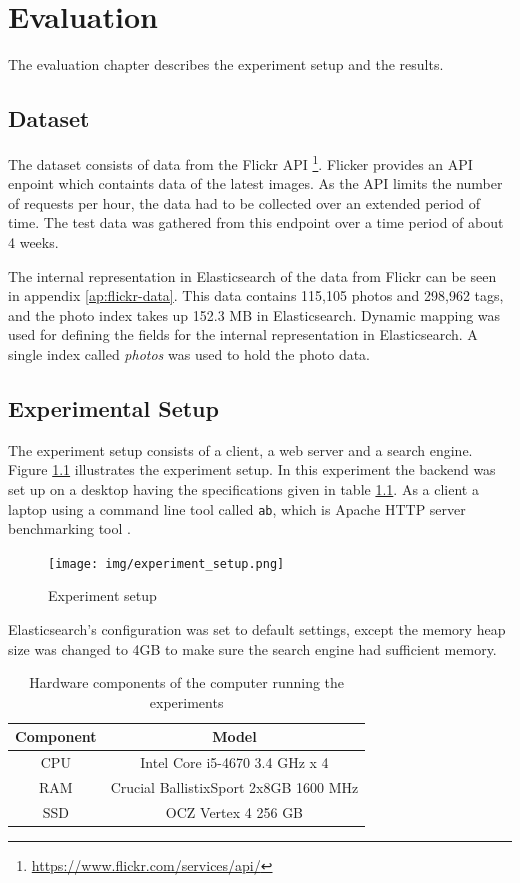 \chapter{Evaluation}
\label{ch:evaluation}
The evaluation chapter describes the experiment setup and the results.

\section{Dataset}
The dataset consists of data from the Flickr API \footnote{\url{https://www.flickr.com/services/api/}}.
Flicker provides an API enpoint which containts data of the latest images.
As the API limits the number of requests per hour, the data had to be collected over an extended period of time.
The test data was gathered from this endpoint over a time period of about 4 weeks.

The internal representation in Elasticsearch of the data from Flickr can be seen in appendix \ref{ap:flickr-data}.
This data contains 115,105 photos and 298,962 tags, and the photo index takes up 152.3 MB in Elasticsearch.
Dynamic mapping was used for defining the fields for the internal representation in Elasticsearch.
A single index called \textit{photos} was used to hold the photo data.

\section{Experimental Setup}
The experiment setup consists of a client, a web server and a search engine.
Figure \ref{fig:experiment-setup} illustrates the experiment setup.
In this experiment the backend was set up on a desktop having the specifications given in table \ref{tbl:hardware}.
As a client a laptop using a command line tool called \texttt{ab}, which is Apache HTTP server benchmarking tool \cite{apache-benchmark}.

\begin{figure}[h!]
  \centering \texttt{[image: img/experiment\_setup.png]}
  \caption{Experiment setup}
  \label{fig:experiment-setup}
\end{figure}

Elasticsearch's configuration was set to default settings,
except the memory heap size was changed to 4GB to make sure the search engine had sufficient memory.

\begin{table}[h]
    \centering
    \begin{tabular}{c|c}
      \textbf{Component} & \textbf{Model} \\ \hline
      CPU       & Intel Core i5-4670 3.4 GHz x 4        \\ \hline
      RAM       & Crucial BallistixSport 2x8GB 1600 MHz \\ \hline
      SSD       & OCZ Vertex 4 256 GB                   \\ \hline
    \end{tabular}
    \caption{Hardware components of the computer running the experiments}
    \label{tbl:hardware}
\end{table}

